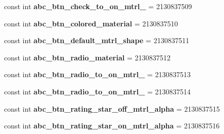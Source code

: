 \begin{DoxyCompactItemize}
const int {\bfseries abc\+\_\+btn\+\_\+check\+\_\+to\+\_\+on\+\_\+mtrl\+\_} = 2130837509
\item 
\mbox{\label{class_pinned_app_1_1_droid_1_1_resource_1_1_drawable_aace609b2489b3c8583129dc3acd105c1}} 
const int {\bfseries abc\+\_\+btn\+\_\+colored\+\_\+material} = 2130837510
\item 
\mbox{\label{class_pinned_app_1_1_droid_1_1_resource_1_1_drawable_aaf242ff5143818770ee235f217577c2d}} 
const int {\bfseries abc\+\_\+btn\+\_\+default\+\_\+mtrl\+\_\+shape} = 2130837511
\item 
\mbox{\label{class_pinned_app_1_1_droid_1_1_resource_1_1_drawable_add785ba2785f39c949439437f0f1e5cc}} 
const int {\bfseries abc\+\_\+btn\+\_\+radio\+\_\+material} = 2130837512
\item 
\mbox{\label{class_pinned_app_1_1_droid_1_1_resource_1_1_drawable_a9721d9e51e1a9f425319ac980311a28d}} 
const int {\bfseries abc\+\_\+btn\+\_\+radio\+\_\+to\+\_\+on\+\_\+mtrl\+\_} = 2130837513
\item 
\mbox{\label{class_pinned_app_1_1_droid_1_1_resource_1_1_drawable_a1b50085927e4b514196420bb5cb70cbf}} 
const int {\bfseries abc\+\_\+btn\+\_\+radio\+\_\+to\+\_\+on\+\_\+mtrl\+\_} = 2130837514
\item 
\mbox{\label{class_pinned_app_1_1_droid_1_1_resource_1_1_drawable_a1bad6b2c81a997e6946a04e9758cee25}} 
const int {\bfseries abc\+\_\+btn\+\_\+rating\+\_\+star\+\_\+off\+\_\+mtrl\+\_\+alpha} = 2130837515
\item 
\mbox{\label{class_pinned_app_1_1_droid_1_1_resource_1_1_drawable_aff6a5441b5d97c1d04a61de3557d65b9}} 
const int {\bfseries abc\+\_\+btn\+\_\+rating\+\_\+star\+\_\+on\+\_\+mtrl\+\_\+alpha} = 2130837516
\item 
\mbox{\label{class_pinned_app_1_1_droid_1_1_resource_1_1_drawable_a19819074895bc4c4bfd63408465ffed0}} 

\end{DoxyCompactItemize}
